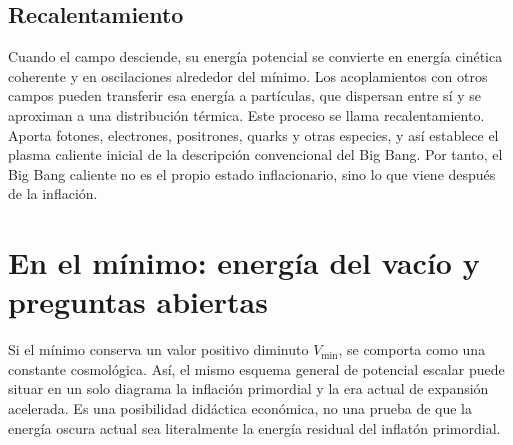 \subsection{Recalentamiento}

Cuando el campo desciende, su energía potencial se convierte en energía cinética coherente y en oscilaciones alrededor del mínimo. Los acoplamientos con otros campos pueden transferir esa energía a partículas, que dispersan entre sí y se aproximan a una distribución térmica. Este proceso se llama recalentamiento. Aporta fotones, electrones, positrones, quarks y otras especies, y así establece el plasma caliente inicial de la descripción convencional del Big Bang. Por tanto, el Big Bang caliente no es el propio estado inflacionario, sino lo que viene después de la inflación.

\begin{classroomqa}
\end{classroomqa}

\begin{classroomqa}
\end{classroomqa}

\section{En el mínimo: energía del vacío y preguntas abiertas}

Si el mínimo conserva un valor positivo diminuto \(V_{\min}\), se comporta como una constante cosmológica. Así, el mismo esquema general de potencial escalar puede situar en un solo diagrama la inflación primordial y la era actual de expansión acelerada. Es una posibilidad didáctica económica, no una prueba de que la energía oscura actual sea literalmente la energía residual del inflatón primordial.

